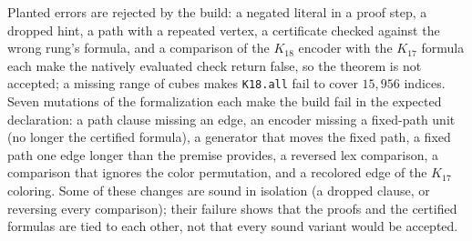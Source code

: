 Planted errors are rejected by the build: a negated literal in a proof
step, a dropped hint, a path with a repeated vertex, a certificate checked
against the wrong rung's formula, and a comparison of the $K_{18}$ encoder
with the $K_{17}$ formula each make the natively evaluated check return
false, so the theorem is not accepted; a missing range of cubes makes
\texttt{K18.all} fail to cover $15{,}956$ indices. Seven mutations of the
formalization each make the build fail in the expected declaration: a path
clause missing an edge, an encoder missing a fixed-path unit (no longer the
certified formula), a generator that moves the fixed path, a fixed path one
edge longer than the premise provides, a reversed lex comparison, a
comparison that ignores the color permutation, and a recolored edge of the
$K_{17}$ coloring. Some of these changes are sound in isolation (a dropped
clause, or reversing every comparison); their failure shows that the proofs
and the certified formulas are tied to each other, not that every sound
variant would be accepted.


